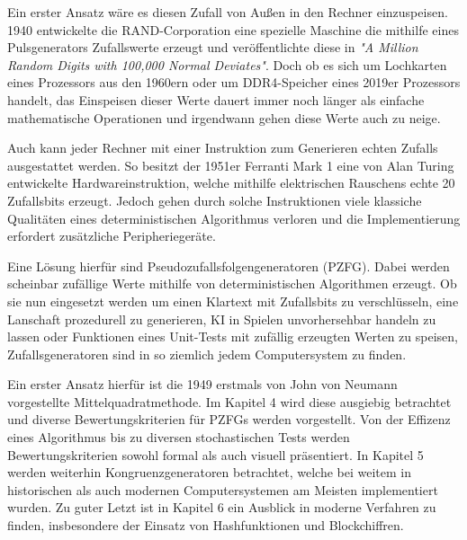 \documentclass{article}
\begin{document}
    \noindent\newline Ein erster Ansatz w\"are es diesen Zufall von Au{\ss}en in den Rechner einzuspeisen.
    1940 entwickelte die RAND-Corporation eine spezielle Maschine die mithilfe eines Pulsgenerators Zufallswerte
    erzeugt und ver\"offentlichte diese in \textit{"A Million Random Digits with 100,000 Normal Deviates"}.
    Doch ob es sich um Lochkarten eines Prozessors aus den 1960ern oder um DDR4-Speicher eines 2019er Prozessors
    handelt, das Einspeisen dieser Werte dauert immer noch l\"anger als einfache mathematische Operationen und
    irgendwann gehen diese Werte auch zu neige.

    \noindent\newline Auch kann jeder Rechner mit einer Instruktion zum Generieren echten Zufalls ausgestattet werden.
    So besitzt der 1951er Ferranti Mark 1 eine von Alan Turing entwickelte Hardwareinstruktion, welche mithilfe
    elektrischen Rauschens echte 20 Zufallsbits erzeugt.
    Jedoch gehen durch solche Instruktionen viele klassiche Qualit\"aten eines deterministischen Algorithmus verloren
    und die Implementierung erfordert zus\"atzliche Peripherieger\"ate.

    \noindent\newline Eine L\"osung hierf\"ur sind Pseudozufallsfolgengeneratoren (PZFG).
    Dabei werden scheinbar zuf\"allige Werte mithilfe von deterministischen Algorithmen erzeugt.
    Ob sie nun eingesetzt werden um einen Klartext mit Zufallsbits zu verschl\"usseln, eine Lanschaft prozedurell
    zu generieren, KI in Spielen unvorhersehbar handeln zu lassen oder Funktionen eines Unit-Tests mit zuf\"allig
    erzeugten Werten zu speisen, Zufallsgeneratoren sind in so ziemlich jedem Computersystem zu finden.

    \noindent\newline Ein erster Ansatz hierf\"ur ist die 1949 erstmals von John von Neumann vorgestellte
    Mittelquadratmethode.
    Im Kapitel 4 wird diese ausgiebig betrachtet und diverse Bewertungskriterien f\"ur PZFGs werden vorgestellt.
    Von der Effizenz eines Algorithmus bis zu diversen stochastischen Tests werden Bewertungskriterien sowohl formal
    als auch visuell pr\"asentiert.
    In Kapitel 5 werden weiterhin Kongruenzgeneratoren betrachtet, welche bei weitem in historischen als auch modernen
    Computersystemen am Meisten implementiert wurden.
    Zu guter Letzt ist in Kapitel 6 ein Ausblick in moderne Verfahren zu finden, insbesondere der Einsatz von
    Hashfunktionen und Blockchiffren.
    \pagebreak
\end{document}
